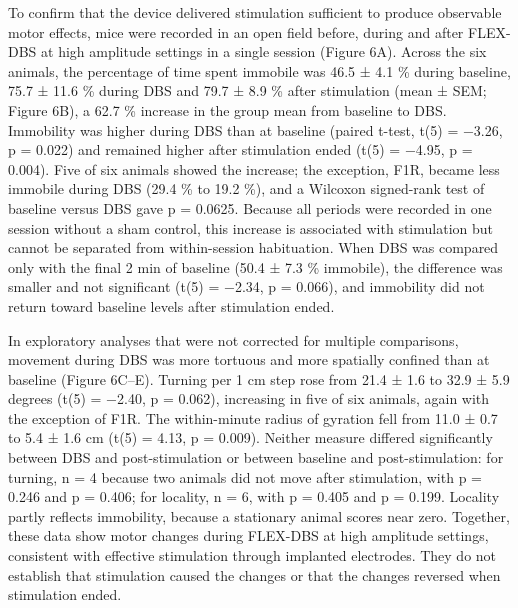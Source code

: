 To confirm that the device delivered stimulation sufficient to produce observable motor effects, mice were recorded in an open field before, during and after FLEX-DBS at high amplitude settings in a single session (Figure 6A). Across the six animals, the percentage of time spent immobile was 46.5 ± 4.1 \% during baseline, 75.7 ± 11.6 \% during DBS and 79.7 ± 8.9 \% after stimulation (mean ± SEM; Figure 6B), a 62.7 \% increase in the group mean from baseline to DBS. Immobility was higher during DBS than at baseline (paired t-test, t(5) = −3.26, p = 0.022) and remained higher after stimulation ended (t(5) = −4.95, p = 0.004). Five of six animals showed the increase; the exception, F1R, became less immobile during DBS (29.4 \% to 19.2 \%), and a Wilcoxon signed-rank test of baseline versus DBS gave p = 0.0625. Because all periods were recorded in one session without a sham control, this increase is associated with stimulation but cannot be separated from within-session habituation. When DBS was compared only with the final 2 min of baseline (50.4 ± 7.3 \% immobile), the difference was smaller and not significant (t(5) = −2.34, p = 0.066), and immobility did not return toward baseline levels after stimulation ended.

In exploratory analyses that were not corrected for multiple comparisons, movement during DBS was more tortuous and more spatially confined than at baseline (Figure 6C--E). Turning per 1 cm step rose from 21.4 ± 1.6 to 32.9 ± 5.9 degrees (t(5) = −2.40, p = 0.062), increasing in five of six animals, again with the exception of F1R. The within-minute radius of gyration fell from 11.0 ± 0.7 to 5.4 ± 1.6 cm (t(5) = 4.13, p = 0.009). Neither measure differed significantly between DBS and post-stimulation or between baseline and post-stimulation: for turning, n = 4 because two animals did not move after stimulation, with p = 0.246 and p = 0.406; for locality, n = 6, with p = 0.405 and p = 0.199. Locality partly reflects immobility, because a stationary animal scores near zero. Together, these data show motor changes during FLEX-DBS at high amplitude settings, consistent with effective stimulation through implanted electrodes. They do not establish that stimulation caused the changes or that the changes reversed when stimulation ended.
